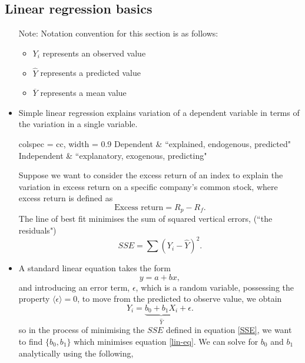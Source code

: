 \documentclass[../notes_compiled.tex]{subfiles}
\begin{document}
\subsection{Linear regression basics}
\begin{itemize}
\item[Note:] Notation convention for this section is as follows:
\begin{itemize}
\item $Y_{i}$ represents an observed value
\item $\widehat{Y}$ represents a predicted value
\item $\overline{Y}$ represents a mean value
\end{itemize}
\item Simple linear regression explains variation of a dependent variable in terms of the variation in a single variable. 
\begin{table}[h!]
\centering
\begin{tblr}{colspec = {cc}, width = 0.9\textwidth}
Dependent & ``explained, endogenous, predicted" \\
Independent & ``explanatory, exogenous, predicting"
\end{tblr}
\end{table}
Suppose we want to consider the excess return of an index to explain the variation in excess return on a specific company's common stock, where excess return is defined as
\begin{equation*}
\text{Excess return} = R_{p}-R_{f}.
\end{equation*}
The line of best fit minimises the sum of squared vertical errors, (``the residuals")
\begin{equation}
SSE = \sum(Y_{i}-\widehat{Y})^{2}. \label{SSE}
\end{equation}
\item A standard linear equation takes the form
\begin{equation}
y=a+bx,
\end{equation}
and introducing an error term, $\epsilon$, which is a random variable, possessing the property $\langle\epsilon\rangle=0$, to move from the predicted to observe value, we obtain
\begin{equation}
Y_{i} = \underbrace{b_{0}+b_{1}X_{i}}_{\widehat{Y}}+\epsilon. \label{lin-eq}
\end{equation}
so in the process of minimising the $SSE$ defined in equation \ref{SSE}, we want to find $\{b_{0},b_{1}\}$ which minimises equation \ref{lin-eq}. We can solve for $b_{0}$ and $b_{1}$ analytically using the following, 

\end{itemize}
\end{document}
